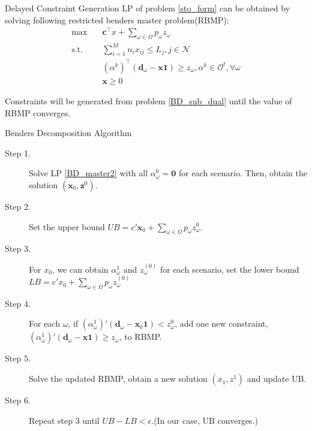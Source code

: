 \begin{frame}{Delayed Constraint Generation}
  LP of problem \eqref{sto_form} can be obtained by solving following restricted benders master problem(RBMP):
  \begin{equation}\label{BD_master2}
    \begin{aligned}
      \max \quad & \mathbf{c}^{\intercal} x + \sum_{\omega \in \Omega} p_{\omega} z_{\omega} \\
      \text {s.t.} \quad & \sum_{i=1}^{M} n_{i} x_{ij} \leq L_j, j \in \mathcal{N} \\
      & (\alpha^{k})^{\intercal}(\mathbf{d}_{\omega}- \mathbf{x} \mathbf{1}) \geq z_{\omega}, \alpha^k \in \mathcal{O}^{t}, \forall \omega \\
       & \mathbf{x} \geq 0
    \end{aligned}
  \end{equation} 

  Constraints will be generated from problem \eqref{BD_sub_dual} until the value of RBMP converges.
\end{frame}

\begin{frame}{Benders Decomposition Algorithm}
  \begin{description}
    \item[Step 1.] Solve LP \eqref{BD_master2} with all $\alpha_{\omega}^0 = \mathbf{0}$ for each scenario.
    Then, obtain the solution $(\mathbf{x}_0, \mathbf{z}^{0})$.

    \item[Step 2.] Set the upper bound $UB = c{'} \mathbf{x}_0 + \sum_{\omega \in \Omega} p_{\omega} z_{\omega}^{0}$.
    \item[Step 3.] 
    For $x_0$, we can obtain $\alpha_{\omega}^{1}$ and $z_{\omega}^{(0)}$ for each scenario, set the lower bound $LB = c{'} x_0 + \sum_{\omega \in \Omega} p_{\omega} z_{\omega}^{(0)}$
    \item[Step 4.]
    For each $\omega$, if $(\alpha_{\omega}^{1}){'}(\mathbf{d}_{\omega}- \mathbf{x}_0 \mathbf{1}) < z_{\omega}^{0}$, add one new constraint, $(\alpha_{\omega}^{1}){'}(\mathbf{d}_{\omega}- \mathbf{x} \mathbf{1}) \geq z_{\omega}$, to RBMP.
    \item[Step 5.] Solve the updated RBMP, obtain a new solution $(x_1, z^{1})$ and update UB.
    \item[Step 6.] Repeat step 3 until $UB - LB < \epsilon$.(In our case, UB converges.)
   \end{description}
\end{frame}


